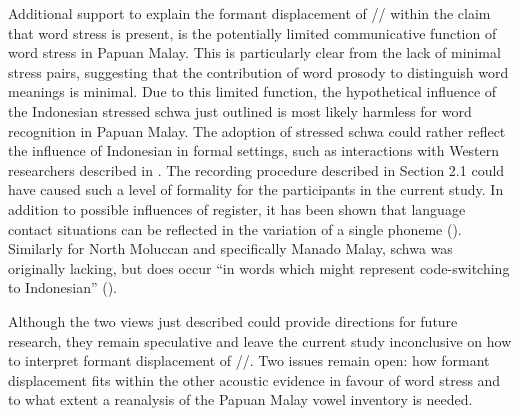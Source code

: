 Additional support to explain the formant displacement of // within the claim that word stress is present, is the potentially limited communicative function of word stress in Papuan Malay. This is particularly clear from the lack of minimal stress pairs, suggesting that the contribution of word prosody to distinguish word meanings is minimal. Due to this limited function, the hypothetical influence of the Indonesian stressed schwa just outlined is most likely harmless for word recognition in Papuan Malay. The adoption of stressed schwa could rather reflect the influence of Indonesian in formal settings, such as interactions with Western researchers described in \citet[18]{kluge_grammar_2017}. The recording procedure described in Section 2.1 could have caused such a level of formality for the participants in the current study. In addition to possible influences of register, it has been shown that language contact situations can be reflected in the variation of a single phoneme (\citealt{kaland_which_2019}). Similarly for North Moluccan and specifically Manado Malay, schwa was originally lacking, but does occur ``in words which might represent code-switching to Indonesian'' (\citealt[95]{paauw_malay_2009}).\par

Although the two views just described could provide directions for future research, they remain speculative and leave the current study inconclusive on how to interpret formant displacement of //. Two issues remain open: how formant displacement fits within the other acoustic evidence in favour of word stress and to what extent a reanalysis of the Papuan Malay vowel inventory is needed.

